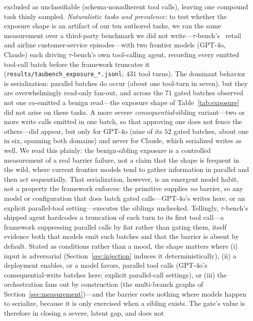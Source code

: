 \documentclass[10pt,journal,compsoc]{IEEEtran}
\begin{document}
excluded as unclassifiable (schema-nonadherent tool calls), leaving one
compound task thinly sampled.
\emph{Naturalistic tasks and prevalence:} to test whether the exposure shape
is an artifact of our ten authored tasks, we ran the same measurement over a
third-party benchmark we did not write---$\tau$-bench's~\cite{taubench24}
retail and airline customer-service episodes---with two frontier models
(GPT-4o, Claude) each driving $\tau$-bench's own tool-calling agent, recording
every emitted tool-call batch before the framework truncates it
(\texttt{results/taubench\_exposure\_*.jsonl}; $431$ tool turns). The dominant
behavior is serialization: parallel batches do occur (about one tool-turn in
seven), but they are overwhelmingly read-only fan-out, and across the $71$
gated batches observed not one co-emitted a benign read---the exposure
shape of Table~\ref{tab:exposure} did not arise on these tasks. A more severe
\emph{consequential}-sibling variant---two or more write calls emitted in one
batch, so that approving one does not fence the others---did appear, but only
for GPT-4o (nine of its $52$ gated batches, about one in six, spanning both
domains) and never for Claude, which serialized writes as well. We read this plainly: the benign-sibling exposure
is a controlled measurement of a real barrier failure, not a claim that the
shape is frequent in the wild, where current frontier models tend to gather
information in parallel and then act sequentially. That serialization, however,
is an emergent model habit, not a property the framework enforces: the
primitive supplies \emph{no} barrier, so any model or configuration that does
batch gated calls---GPT-4o's writes here, or an explicit parallel-tool
setting---executes the siblings unchecked. Tellingly, $\tau$-bench's shipped
agent hardcodes a truncation of each turn to its first tool call---a framework
suppressing parallel calls by fiat rather than gating them, itself evidence
both that models emit such batches and that the barrier is absent by default.
Stated as conditions rather than a mood, the shape matters where (i) input is
adversarial (Section~\ref{sec:injection} induces it deterministically),
(ii) a deployment enables, or a model favors, parallel tool calls (GPT-4o's
consequential-write batches here; explicit parallel-call settings), or
(iii) the orchestration fans out by construction (the multi-branch graphs of
Section~\ref{sec:measurement})---and the barrier costs nothing where models
happen to serialize, because it is only exercised when a sibling exists.
The gate's value is therefore in closing a severe, latent gap, and does not
\end{document}

